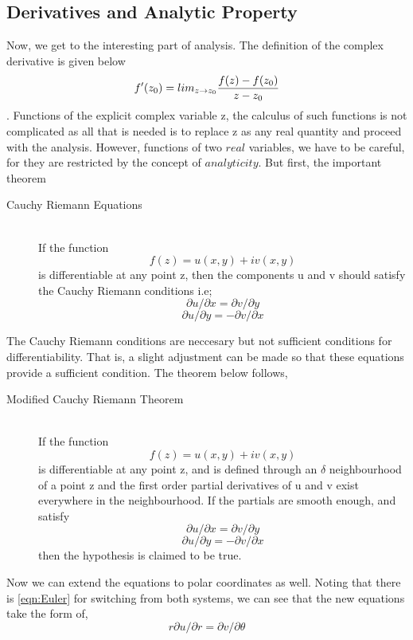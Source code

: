 \documentclass[11pt]{article}
\begin{document}
\begin{sloppypar}
\subsection{Derivatives and Analytic Property}
Now, we get to the interesting part of analysis. The definition of the complex derivative is given below
$$f\rq{}(z_{0}) = lim_{z \to z_{0}}\frac{f(z) - f(z_{0})}{z-z_{0}}$$. Functions of the explicit complex variable z, the calculus of such functions is not complicated as all that is needed is to replace z as any real quantity and proceed with the analysis. However, functions of two $real$ variables, we have to be careful, for they are restricted by the concept of $analyticity$.
But first, the important theorem
\begin{description}
\item[Cauchy Riemann Equations] \hfill \\
	If the function $$f(z)= u(x,y)+iv(x,y)$$ is differentiable at any point z, then the components u and v should satisfy the Cauchy Riemann conditions i.e;
	\begin{equation}
	\partial u/\partial x = \partial v/\partial y
	\end{equation}
	\begin{equation}
	\partial u/\partial y = -\partial v/\partial x
\end{equation}
\end{description}
 The Cauchy Riemann conditions are neccesary but not sufficient conditions for differentiability. That is, a slight adjustment can be made so that these equations provide a sufficient condition. The theorem below follows,
 \begin{description}
\item[Modified Cauchy Riemann Theorem] \hfill \\
	If the function $$f(z)= u(x,y)+iv(x,y)$$ is differentiable at any point z, and is defined through an $\delta$ neighbourhood of a point z and the first order partial derivatives of u and v exist everywhere in the neighbourhood. If the partials are smooth enough, and satisfy 
	$$\partial u/\partial x = \partial v/\partial y$$
	$$\partial u/\partial y = -\partial v/\partial x$$
then the hypothesis is claimed to be true. 
\end{description}
Now we can extend the equations to polar coordinates as well. Noting that there is \eqref{eqn:Euler} for switching from both systems, we can see that the new equations take the form of,
	\begin{equation}
	r\partial u/\partial r = \partial v/\partial \theta

\end{equation}
\end{sloppypar}
\end{document}
